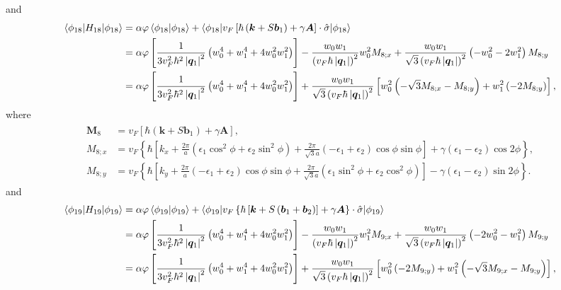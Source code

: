 \documentclass[10pt, oneside]{article}
\newcommand{\vph}{\varphi}
\newcommand{\p}[1]{\left(#1\right)}
\newcommand{\bb}[1]{\left[#1\right]}
\newcommand{\br}[1]{\left\{#1\right\}}
\newcommand{\bv}[1]{\left|#1\right|}
\begin{document}
and 
\begin{align}
	\begin{split}
		\braket{\phi_{18} | H_{18} | \phi_{18}} & = \alpha \vph \braket{\phi_{18} | \phi_{18}} + \braket{\phi_{18} | v_{F} \bb{\hbar \p{\bm{k} + S \bm{b}_{1}} + \gamma \bm{A}} \cdot \hat{\sigma} | \phi_{18}} \\
		& = \alpha \vph \bb{\frac{1}{3 v_{F}^{2} \hbar^{2} \bv{\bm{q}_{1}}^{2}} \p{w_{0}^{4} + w_{1}^{4} + 4 w_{0}^{2} w_{1}^{2}}} - \frac{w_0 w_1}{\p{v_{F} \hbar \bv{\bm{q}_1}}^2}  w_0^2 M_{8;x} + \frac{w_0 w_1}{\sqrt{3} \p{v_{F} \hbar \bv{\bm{q}_1}}^2} \p{ - w^{2}_{0} - 2 w_{1}^{2}} M_{8;y} \\
		& = \alpha \vph \bb{\frac{1}{3 v_{F}^{2} \hbar^{2} \bv{\bm{q}_{1}}^{2}} \p{w_{0}^{4} + w_{1}^{4} + 4 w_{0}^{2} w_{1}^{2}}} + \frac{w_0 w_1}{\sqrt{3} \p{v_{F} \hbar \bv{\bm{q}_{1}}}^2} \bb{w_0^2 \p{- \sqrt{3} M_{8;x} - M_{8;y}} +  w_1^2 \p{-2 M_{8;y}}},
	\end{split}
\end{align}
where
\begin{align}
	\begin{split}
		\bm{M}_{8} & = v_{F} \bb{\hbar \p{\bm{k} + S \bm{b}_{1}} + \gamma \bm{A}}, \\
		M_{8;x} & = v_{F} \br{\hbar \bb{k_{x} + \frac{2 \pi}{a} \p{\epsilon_{1} \cos^{2}{\phi} + \epsilon_{2} \sin^{2}{\phi}} + \frac{2 \pi}{\sqrt{3} a}\p{ - \epsilon_{1} + \epsilon_{2} } \cos{\phi} \sin{\phi}} + \gamma \p{\epsilon_{1} - \epsilon_{2}} \cos{2 \phi}}, \\
		M_{8;y} & = v_{F} \br{\hbar \bb{k_{y} + \frac{2 \pi}{ a} \p{ - \epsilon_{1} + \epsilon_{2} } \cos{\phi	} \sin{\phi}  + \frac{2 \pi}{\sqrt{3} a}\p{\epsilon_{1} \sin^{2}{\phi} + \epsilon_{2} \cos^{2}{\phi}}} - \gamma \p{\epsilon_{1} - \epsilon_{2}} \sin{2 \phi}}.	
	\end{split}
\end{align}
and 
\begin{align}
	\begin{split}
		\braket{\phi_{19} | H_{19} | \phi_{19}} & = \alpha \vph \braket{\phi_{19} | \phi_{19}} + \braket{\phi_{19} | v_{F} \br{\hbar \bb{\bm{k} + S\p{\bm{b}_{1} + \bm{b}_{2}}} + \gamma \bm{A}} \cdot \hat{\sigma} | \phi_{19}}  \\
		& = \alpha \vph \bb{\frac{1}{3 v_{F}^{2} \hbar^{2} \bv{\bm{q}_{1}}^{2}} \p{w_{0}^{4} + w_{1}^{4} + 4 w_{0}^{2} w_{1}^{2}}} - \frac{w_0 w_1}{\p{v_{F} \hbar \bv{\bm{q}_1}}^2}  w_1^2 M_{9;x} + \frac{w_0 w_1}{\sqrt{3} \p{v_{F} \hbar \bv{\bm{q}_1}}^2} \p{ - 2 w_0^2 - w_1^2 } M_{9;y} \\
		& = \alpha \vph \bb{\frac{1}{3 v_{F}^{2} \hbar^{2} \bv{\bm{q}_{1}}^{2}} \p{w_{0}^{4} + w_{1}^{4} + 4 w_{0}^{2} w_{1}^{2}}} + \frac{w_0 w_1}{\sqrt{3} \p{v_{F} \hbar \bv{\bm{q}_1}}^2} \bb{w_0^2 \p{-2 M_{9;y}} + w_1^2 \p{ - \sqrt{3} M_{9;x} - M_{9;y}}},
	\end{split}
\end{align}
\end{document}
